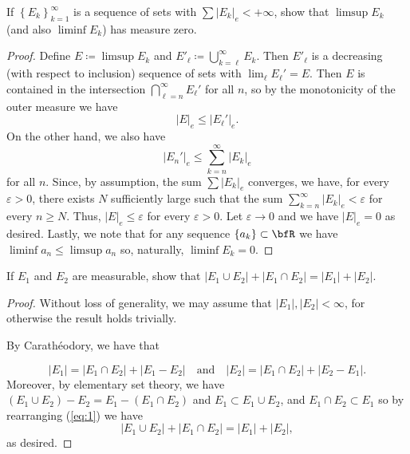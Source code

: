 \begin{problem}
If $\left\{E_k\right\}_{k=1}^\infty$ is a sequence of sets with
$\sum\left|E_k\right|_e<+\infty$, show that $\limsup E_k$ (and
also $\liminf E_k$) has measure zero.
\end{problem}
\begin{proof}
Define $E\coloneqq\limsup E_k$ and $E'_\ell\coloneqq\bigcup_{k=\ell}^\infty
E_k$. Then $E'_\ell$ is a decreasing (with respect to inclusion) sequence
of sets with $\lim_\ell E_\ell'=E$. Then $E$ is contained in the
intersection $\bigcap_{\ell=n}^\infty E_\ell'$ for all $n$, so by the
monotonicity of the outer measure we have
\[
\left|E\right|_e\leq\left|E_\ell'\right|_e.
\]
On the other hand, we also have
\[
\left|E_n'\right|_e\leq\sum_{k=n}^\infty\left|E_k\right|_e
\]
for all $n$. Since, by assumption, the sum $\sum\left|E_k\right|_e$
converges, we have, for every $\varepsilon>0$, there exists $N$
sufficiently large such that the sum
$\sum_{k=n}^\infty\left|E_k\right|_e<\varepsilon$ for every $n\geq
N$. Thus, $\left|E\right|_e\leq\varepsilon$ for every $\varepsilon>0$. Let
$\varepsilon\to 0$ and we have $\left|E\right|_e=0$ as desired. Lastly, we
note that for any sequence $\left\{a_k\right\}\subset\bfR$ we have
$\liminf a_n\leq\limsup a_n$ so, naturally, $\liminf E_k=0$.
\end{proof}
\newpage

\begin{problem}
If $E_1$ and $E_2$ are measurable, show that
$\left|E_1\cup E_2\right|+\left|E_1\cap
  E_2\right|=\left|E_1\right|+\left|E_2\right|$.
\end{problem}
\begin{proof}
Without loss of generality, we may assume that
$\left|E_1\right|,\left|E_2\right|<\infty$, for otherwise the result holds
trivially.

By Carathéodory, we have that

\begin{equation}
\label{eq:1}
\left|E_1\right|=\left|E_1\cap
  E_2\right|+\left|E_1\minus E_2\right|
\quad\text{and}\quad
\left|E_2\right|=\left|E_1\cap
  E_2\right|+\left|E_2\minus E_1\right|.
\end{equation}
Moreover, by elementary set theory, we have $\left(E_1\cup E_2\right)\minus
E_2=E_1\minus\left(E_1\cap E_2\right)$ and $E_1\subset E_1\cup E_2$, and
$E_1\cap E_2\subset E_1$ so by rearranging (\ref{eq:1}) we have
\[
\left|E_1\cup E_2\right|+\left|E_1\cap
  E_2\right|=\left|E_1\right|+\left|E_2\right|,
\]
as desired.
\end{proof}

